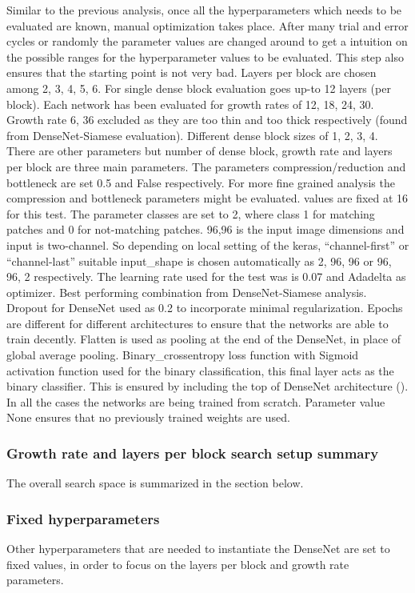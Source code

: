 Similar to the previous analysis, once all the hyperparameters which needs to be evaluated are known, manual optimization takes place. 
After many trial and error cycles or randomly the parameter values are changed around to get a intuition on the possible ranges for the hyperparameter values to be evaluated. This step also ensures that the starting point is not very bad.
Layers per block are chosen among 2, 3, 4, 5, 6. For single dense block evaluation goes up-to 12 layers (per block). 
Each network has been evaluated for growth rates of 12, 18, 24, 30. Growth rate 6, 36 excluded as they are too thin and too thick respectively (found from DenseNet-Siamese evaluation). Different dense block sizes of 1, 2, 3, 4.  
There are other parameters but number of dense block, growth rate and layers per block are three main parameters. The parameters compression/reduction and bottleneck are set 0.5 and False respectively. 
For more fine grained analysis the compression and bottleneck parameters might be evaluated.  values are fixed at 16 for this test. The parameter classes are set to 2, where class 1 for matching patches and 0 
for not-matching patches. 96,96 is the input image dimensions and input is two-channel. So depending on local setting of the keras, “channel-first” or “channel-last” suitable input\_shape is 
chosen automatically as  2, 96, 96  or 96, 96, 2 respectively. The learning rate used for the test was is 0.07 and Adadelta as optimizer. Best performing combination from DenseNet-Siamese analysis. 
Dropout for DenseNet used as 0.2 to incorporate minimal regularization. Epochs are different for different architectures to ensure that the networks are able to train decently. 
Flatten is used as pooling at the end of the DenseNet, in place of global average pooling. Binary\_crossentropy loss function with Sigmoid activation function used for the binary classification, this final layer acts as the binary classifier.
This is ensured by including the top of DenseNet architecture (). In all the cases the networks are being trained from scratch. Parameter  value None ensures that no previously trained weights are used.

\subsubsection{Growth rate and layers per block search setup summary}
The overall search space is summarized in the section below.
\subsubsection{Fixed hyperparameters}
\label{fixed_params}
Other hyperparameters that are needed to instantiate the DenseNet are set to fixed values, in order to focus on the layers per block and growth rate parameters.

